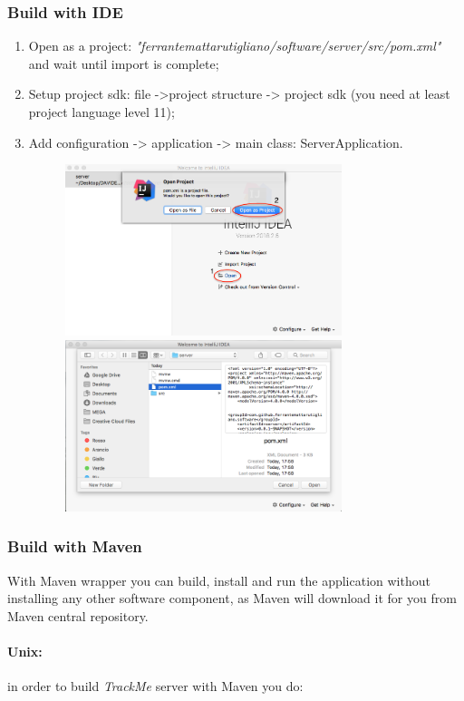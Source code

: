 \documentclass[a4paper]{article}
\begin{document}
\subsubsection{Build with IDE}
\begin{enumerate}
    \item Open as a project: \textit{"ferrantemattarutigliano/software/server/src/pom.xml"} and wait until import is complete;
    \item Setup project sdk: file ->project structure -> project sdk (you need at least project language level 11);
    \item Add configuration -> application -> main class: ServerApplication.
    \begin{figure}[!htpb]
    \centering
    \includegraphics[height=50mm]{ITD/images/intellij_idea1.png}
    \includegraphics[height=50mm]{ITD/images/intellij_idea2.png}
    \end{figure}
\end{enumerate}

\subsubsection{Build with Maven}
With Maven wrapper you can build, install and run the application without installing any other software component, as Maven will download it for you from Maven central repository.

\paragraph{Unix:} in order to build \textit{TrackMe} server with Maven you do:
\end{document}
